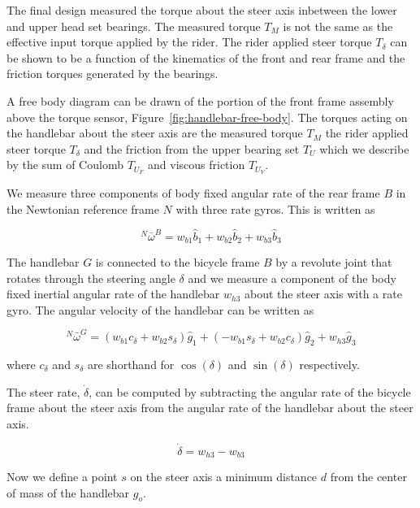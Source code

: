 \documentclass[10pt]{article}
\begin{document}
The final design measured the torque about the steer axis inbetween the lower
and upper head set bearings. The measured torque $T_M$ is not the same as the
effective input torque applied by the rider. The rider applied steer torque
$T_\delta$ can be shown to be a function of the kinematics of the front and
rear frame and the friction torques generated by the bearings.

A free body diagram can be drawn of the portion of the front frame assembly
above the torque sensor, Figure~\ref{fig:handlebar-free-body}. The torques
acting on the handlebar about the steer axis are the measured torque $T_M$ the
rider applied steer torque $T_\delta$ and the friction from the upper bearing
set $T_U$ which we describe by the sum of Coulomb $T_{U_F}$ and viscous
friction $T_{U_V}$.

We measure three components of body fixed angular rate of the rear frame $B$ in
the Newtonian reference frame $N$ with three rate gyros. This is written as

\begin{equation}
  ^N\bar{\omega}^B = w_{b1}\hat{b}_1 + w_{b2}\hat{b}_2 +
  w_{b3}\hat{b}_3
  \label{eq:rear-frame-angular-rate}
\end{equation}

The handlebar $G$ is connected to the bicycle frame $B$ by a revolute joint
that rotates through the steering angle $\delta$ and we measure a component of
the body fixed inertial angular rate of the handlebar $w_{h3}$ about the steer
axis with a rate gyro. The angular velocity of the handlebar can be written as

\begin{equation}
  ^N\bar{\omega}^G = (w_{b1}c_\delta + w_{b2}s_\delta)\hat{g}_1 +
  (-w_{b1}s_\delta + w_{b2}c_\delta)\hat{g}_2 +
  w_{h3}\hat{g}_3
\end{equation}

where $c_\delta$ and $s_\delta$ are shorthand for $\operatorname{cos}(\delta)$
and $\operatorname{sin}(\delta)$ respectively.

The steer rate, $\dot{\delta}$, can be computed by subtracting the angular rate
of the bicycle frame about the steer axis from the angular rate of the
handlebar about the steer axis.

\begin{equation}
  \dot{\delta} = w_{h3} - w_{b3}
\end{equation}

Now we define a point $s$ on the steer axis a minimum distance $d$ from the
center of mass of the handlebar $g_o$.
\end{document}
